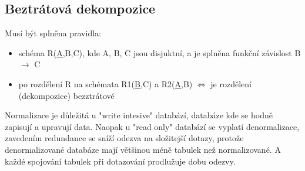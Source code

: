 \documentclass{szzclass}
\begin{document}
\subsection{Beztrátová dekompozice}
Musí být splněna pravidla:
\begin{itemize}
  \item schéma R(\underline{A},B,C), kde A, B, C jsou disjuktní, a je splněna funkční závislost B $\rightarrow$ C
  \item po rozdělení R na schémata R1(\underline{B},C) a R2(\underline{A},B) $\Leftrightarrow$ je rozdělení (dekompozice) bezztrátové
\end{itemize}

Normalizace je důležitá u "write intesive" databází, databáze kde se hodně zapisují a upravují data.
\newline
Naopak u "read only" databází se vyplatí denormalizace, zavedením redundance se sníží odezva na složitejší dotazy, protože denormalizované
databáze mají většinou méně tabulek než normalizované. A každé spojování tabulek při dotazování prodlužuje dobu odezvy.
\end{document}

